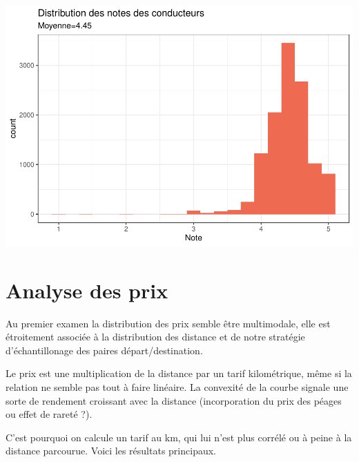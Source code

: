 \documentclass[
]{book}
\begin{document}
\includegraphics{bookdown-demo_files/figure-latex/0907-1.pdf}

\hypertarget{analyse-des-prix}{%
\section{Analyse des prix}\label{analyse-des-prix}}

Au premier examen la distribution des prix semble être multimodale, elle est étroitement associée à la distribution des distance et de notre stratégie d'échantillonage des paires départ/destination.

Le prix est une multiplication de la distance par un tarif kilométrique, même si la relation ne semble pas tout à faire linéaire. La convexité de la courbe signale une sorte de rendement croissant avec la distance (incorporation du prix des péages ou effet de rareté ?).

C'est pourquoi on calcule un tarif au km, qui lui n'est plus corrélé ou à peine à la distance parcourue. Voici les résultats principaux.
\end{document}
